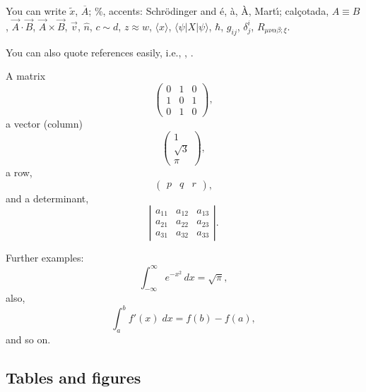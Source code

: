 \documentclass[twocolumn]{revtex4}
\begin{document}
\vspace*{0.5cm}
You can write $\tilde x$,
$\overline{A}$; \%, accents: Schr\"odinger
and \'e, \`a, \`A, Mart\'{\i}; cal\c cotada,
$A \equiv B $, $\vec{A}\cdot\vec{B}$, $\vec{A} \times \vec{B}$,
$\vec{v}$, $\hat{n}$,
$c \sim d$, $z \approx w$, $\langle x \rangle$,
$\langle \psi | X | \psi \rangle$, $\hbar$, $g_{ij}$, $\delta^i_j$,
$R_{\mu \nu \alpha \beta ; \xi}$.

\vspace*{0.5cm}
You can also quote references easily, i.e., \cite{wmap}, \cite{weinberg}.

\vspace*{0.5cm}
A matrix
\begin{equation}
\left(
\begin{array}{ccc}
0 & 1 & 0 \\
1 & 0 & 1 \\
0 & 1 & 0
\end{array}
\right),
\label{matrix1}
\end{equation}
a vector (column)
\begin{equation}
\left(
\begin{array}{c}
1 \\
\sqrt{3}\\
\pi
\end{array}
\right),
\label{hola}
\end{equation}
a row,
\begin{equation}
\left(
\begin{array}{ccc}
p & q & r
\end{array}
\right),
\label{eq:row}
\end{equation}
and a determinant,
\begin{equation}
\left|
\begin{array}{ccc}
a_{11} & a_{12} & a_{13} \\
a_{21} & a_{22} & a_{23} \\
a_{31} & a_{32} & a_{33}
\end{array}
\right|.
\label{determinant}
\end{equation}

\noindent
Further examples:
\begin{equation}
\int_{-\infty}^\infty e^{-x^2} \, dx= \sqrt{\pi},
\label{eq:fine}
\end{equation}
also,
\begin{equation}
\int_a^b f'(x) \; dx=f(b)-f(a),
\label{barrow}
\end{equation}
and so on.

\subsection{Tables and figures}
\end{document}
